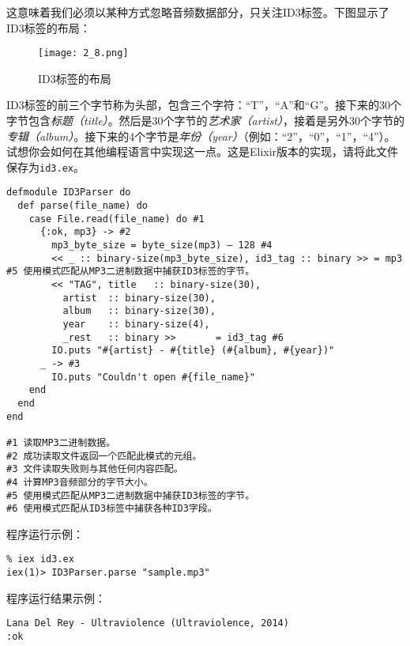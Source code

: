 这意味着我们必须以某种方式忽略音频数据部分，只关注ID3标签。下图显示了ID3标签的布局：

\begin{figure}[!ht]
    \centering
    \texttt{[image: 2\_8.png]}
    \caption{ID3标签的布局}
    \label{fig:2_8}
\end{figure}

ID3标签的前三个字节称为头部，包含三个字符：``T''，``A''和``G''。接下来的30个字节包含\emph{标题（title）}。然后是30个字节的\emph{艺术家（artist）}，接着是另外30个字节的\emph{专辑（album）}。接下来的4个字节是\emph{年份（year）}（例如：``2''，``0''，``1''，``4''）。试想你会如何在其他编程语言中实现这一点。这是Elixir版本的实现，请将此文件保存为\texttt{id3.ex}。

\begin{code}{}
\begin{verbatim}
defmodule ID3Parser do
  def parse(file_name) do
    case File.read(file_name) do #1
      {:ok, mp3} -> #2
        mp3_byte_size = byte_size(mp3) – 128 #4
        << _ :: binary-size(mp3_byte_size), id3_tag :: binary >> = mp3 #5 使用模式匹配从MP3二进制数据中捕获ID3标签的字节。
        << "TAG", title   :: binary-size(30),
          artist  :: binary-size(30),
          album   :: binary-size(30),
          year    :: binary-size(4),
          _rest   :: binary >>       = id3_tag #6
        IO.puts "#{artist} - #{title} (#{album}, #{year})"
      _ -> #3
        IO.puts "Couldn't open #{file_name}"
    end
  end
end

#1 读取MP3二进制数据。
#2 成功读取文件返回一个匹配此模式的元组。
#3 文件读取失败则与其他任何内容匹配。
#4 计算MP3音频部分的字节大小。
#5 使用模式匹配从MP3二进制数据中捕获ID3标签的字节。
#6 使用模式匹配从ID3标签中捕获各种ID3字段。
\end{verbatim}
\end{code}



程序运行示例：

\begin{code}{}
\begin{verbatim}
% iex id3.ex
iex(1)> ID3Parser.parse "sample.mp3"
\end{verbatim}
\end{code}

程序运行结果示例：

\begin{code}{}
\begin{verbatim}
Lana Del Rey - Ultraviolence (Ultraviolence, 2014)
:ok
\end{verbatim}
\end{code}

